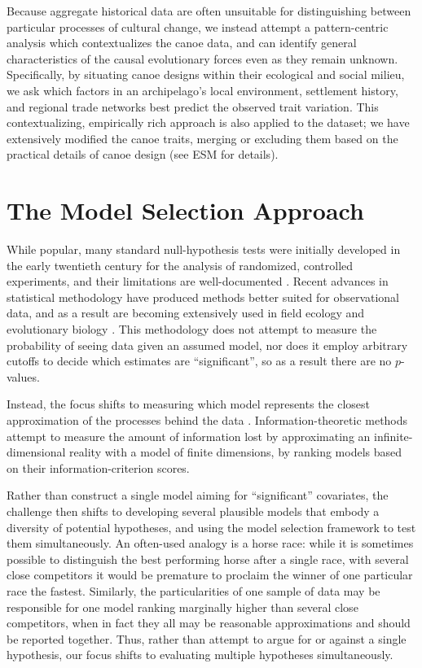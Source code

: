 \documentclass[11pt]{article}
\begin{document}
Because aggregate historical data are often unsuitable for distinguishing between particular processes of cultural change, we instead attempt a pattern-centric analysis which contextualizes the canoe data, and can identify general characteristics of the causal evolutionary forces even as they remain unknown. Specifically, by situating canoe designs within their ecological and social milieu, we ask which factors in an archipelago's local environment, settlement history, and regional trade networks best predict the observed trait variation. This contextualizing, empirically rich approach is also applied to the dataset; we have extensively modified the \cite{Rogers2008:Canoes} canoe traits, merging or excluding them based on the practical details of canoe design (see ESM for details). 

\section{The Model Selection Approach}
 
While popular, many standard null-hypothesis tests were initially developed in the early twentieth century for the analysis of randomized, controlled experiments, and their limitations are well-documented \citep{Berger1988, Cohen1994, Anderson2000hull}. Recent advances in statistical methodology have produced methods better suited for observational data, and as a result are becoming extensively used in field ecology and evolutionary biology \citep{Hilborn1997, Johnson&Omland2004:modelselection, Bolker2008}. This methodology does not attempt to measure the probability of seeing data given an assumed model, nor does it employ arbitrary cutoffs to decide which estimates are ``significant'', so as a result there are no $p$-values.

Instead, the focus shifts to measuring which model represents the closest approximation of the processes behind the data \citep{Burnham&Anderson:2002}. Information-theoretic methods attempt to measure the amount of information lost by approximating an infinite-dimensional reality with a model of finite dimensions, by ranking models based on their information-criterion scores.

Rather than construct a single model aiming for ``significant'' covariates, the challenge then shifts to developing several plausible models that embody a diversity of potential hypotheses, and using the model selection framework to test them simultaneously. An often-used analogy is a horse race: while it is sometimes possible to distinguish the best performing horse after a single race, with several close competitors it would be premature to proclaim the winner of one particular race the fastest. Similarly, the particularities of one sample of data may be responsible for one model ranking marginally higher than several close competitors, when in fact they all may be reasonable approximations and should be reported together. Thus, rather than attempt to argue for or against a single hypothesis, our focus shifts to evaluating multiple hypotheses simultaneously.
\end{document}
